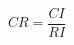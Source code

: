 \documentclass[journal,article,submit,pdftex,moreauthors]{Definitions/mdpi}
\begin{document}
\begin{equation}
CR = \frac{CI}{RI}
\label{eq:cr}
\end{equation}











\end{document}
